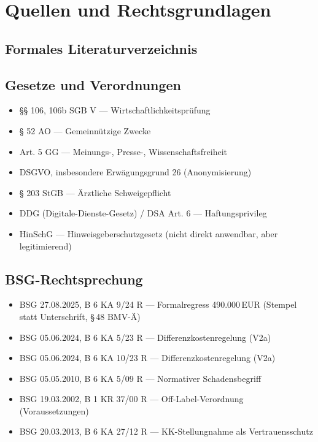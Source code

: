 \documentclass{umbruch-position}
\begin{document}
\section{Quellen und Rechtsgrundlagen}

\subsection*{Formales Literaturverzeichnis}

\nocite{*}



\subsection{Gesetze und Verordnungen}

\begin{itemize}[nosep]
  \item §§ 106, 106b SGB V — Wirtschaftlichkeitsprüfung
  \item § 52 AO — Gemeinnützige Zwecke
  \item Art. 5 GG — Meinungs-, Presse-, Wissenschaftsfreiheit
  \item DSGVO, insbesondere Erwägungsgrund 26 (Anonymisierung)
  \item § 203 StGB — Ärztliche Schweigepflicht
  \item DDG (Digitale-Dienste-Gesetz) / DSA Art. 6 — Haftungsprivileg
  \item HinSchG — Hinweisgeberschutzgesetz (nicht direkt anwendbar, aber legitimierend)
\end{itemize}

\subsection{BSG-Rechtsprechung}

\begin{itemize}[nosep]
  \item BSG 27.08.2025, B 6 KA 9/24 R --- Formalregress 490.000\,EUR (Stempel statt Unterschrift, \S\,48 BMV-\"A)
  \item BSG 05.06.2024, B 6 KA 5/23 R --- Differenzkostenregelung (V2a)
  \item BSG 05.06.2024, B 6 KA 10/23 R --- Differenzkostenregelung (V2a)
  \item BSG 05.05.2010, B 6 KA 5/09 R --- Normativer Schadensbegriff
  \item BSG 19.03.2002, B 1 KR 37/00 R --- Off-Label-Verordnung (Voraussetzungen)
  \item BSG 20.03.2013, B 6 KA 27/12 R --- KK-Stellungnahme als Vertrauensschutz
\end{itemize}
\end{document}
